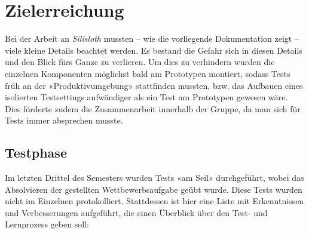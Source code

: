 \section{Zielerreichung}
\label{sec:zielerreichung}

Bei der Arbeit an \textit{Silisloth} mussten -- wie die vorliegende Dokumentation zeigt -- viele kleine Details beachtet werden. Es bestand die Gefahr sich in diesen Details und den Blick fürs Ganze zu verlieren. Um dies zu verhindern wurden die einzelnen Komponenten möglichst bald am Prototypen montiert, sodass Tests früh an der «Produktivumgebung» stattfinden mussten, bzw. das Aufbauen eines isolierten Testsettings aufwändiger als ein Test am Prototypen gewesen wäre. Dies förderte zudem die Zusammenarbeit innerhalb der Gruppe, da man sich für Tests immer absprechen musste.

\subsection{Testphase}

Im letzten Drittel des Semesters wurden Tests «am Seil» durchgeführt, wobei das Absolvieren der gestellten Wettbewerbsaufgabe geübt wurde. Diese Tests wurden nicht im Einzelnen protokolliert. Stattdessen ist hier eine Liste mit Erkenntnissen und Verbesserungen aufgeführt, die einen Überblick über den Test- und Lernprozess geben soll:


